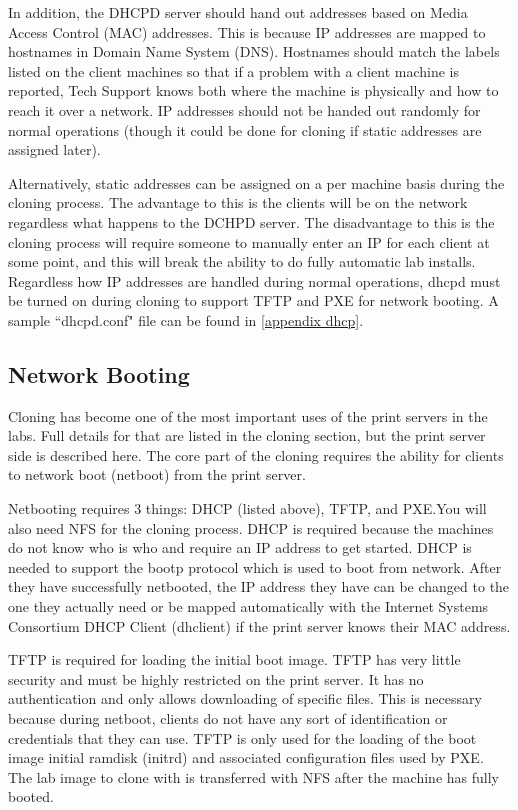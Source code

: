In addition, the DHCPD server should hand out addresses based on Media Access Control (MAC) addresses.  This is because IP addresses are mapped to hostnames in Domain Name System (DNS).  Hostnames should match the labels listed on the client machines so that if a problem with a client machine is reported, Tech Support knows both where the machine is physically and how to reach it over a network.  IP addresses should not be handed out randomly for normal operations (though it could be done for cloning if static addresses are assigned later).  

Alternatively, static addresses can be assigned on a per machine basis during the cloning process.  The advantage to this is the clients will be on the network regardless what happens to the DCHPD server.  The disadvantage to this is the cloning process will require someone to manually enter an IP for each client at some point, and this will break the ability to do fully automatic lab installs.   Regardless how IP addresses are handled during normal operations, dhcpd must be turned on during cloning to support TFTP and PXE for network booting.  A sample ``dhcpd.conf" file can be found in \ref{appendix dhcp}.

\subsection{Network Booting}
Cloning has become one of the most important uses of the print servers in the labs.  Full details for that are listed in the cloning section, but the print server side is described here.  The core part of the cloning requires the ability for clients to network boot (netboot) from the print server.  

Netbooting requires 3 things:  DHCP (listed above), TFTP, and PXE.You will also need NFS for the cloning process.  DHCP is required because the machines do not know who is who and require an IP address to get started.  DHCP is needed to support the bootp protocol which is used to boot from network.  After they have successfully netbooted, the IP address they have can be changed to the one they actually need or be mapped automatically with the Internet Systems Consortium DHCP Client (dhclient) if the print server knows their MAC address.  

TFTP is required for loading the initial boot image.  TFTP has very little security and must be highly restricted on the print server.  It has no authentication and only allows downloading of specific files.  This is necessary because during netboot, clients do not have any sort of identification or credentials that they can use.  TFTP is only used for the loading of the boot image initial ramdisk (initrd) and associated configuration files used by PXE.  The lab image to clone with is transferred with NFS after the machine has fully booted.  


